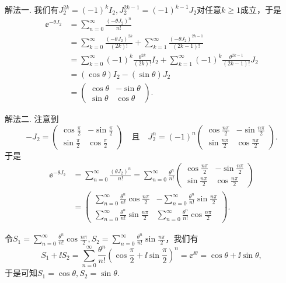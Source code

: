 \setcounter{solution}{20}

\begin{solution}
  {\kaishu 解法一.} 我们有$J_2^{2k}=(-1)^kI_2,J_2^{2k-1}=(-1)^{k-1}J_2$对任意$k\ge1$成立，于是
  \begin{align*}
    \ee^{-\theta J_2} & = \sum_{n=0}^\infty \frac{(-\theta J_2)^n}{n!} \\
    & = \sum_{k=0}^\infty \frac{(-\theta J_2)^{2k}}{(2k)!} + \sum_{k=1}^\infty \frac{(-\theta J_2)^{2k-1}}{(2k-1)!} \\
    & = \sum_{k=0}^\infty(-1)^k \frac{\theta^{2k}}{(2k)!}I_2 + \sum_{k=1}^\infty(-1)^k \frac{\theta^{2k-1}}{(2k-1)!}J_2 \\
    & = (\cos\theta)I_2 - (\sin\theta)J_2 \\
    & = \begin{pmatrix}
      \cos\theta & - \sin\theta \\
      \sin\theta & \cos\theta
    \end{pmatrix}.
  \end{align*}

  {\kaishu 解法二.} 注意到
  \[
    -J_2 = \begin{pmatrix}
      \cos\frac\pi2 & -\sin\frac\pi2 \\
      \sin\frac\pi2 & \cos\frac\pi2
    \end{pmatrix} \quad \text{且} \quad
    J_2^n = (-1)^n \begin{pmatrix}
      \cos\frac{n\pi}2 & -\sin\frac{n\pi}2 \\
      \sin\frac{n\pi}2 & \cos\frac{n\pi}2
    \end{pmatrix}.
  \]
  于是
  \begin{align*}
    \ee^{-\theta J_2} & = \sum_{n=0}^\infty \frac{(\theta J_2)^n}{n!} = \sum_{n=0}^\infty \frac{\theta^n}{n!} \begin{pmatrix}
      \cos\frac{n\pi}2 & -\sin\frac{n\pi}2 \\
      \sin\frac{n\pi}2 & \cos\frac{n\pi}2
    \end{pmatrix} \\
    & = \begin{pmatrix}
      \sum_{n=0}^\infty \frac{\theta^n}{n!}\cos\frac{n\pi}2 & -\sum_{n=0}^\infty \frac{\theta^n}{n!}\sin\frac{n\pi}2 \\
      \sum_{n=0}^\infty\frac{\theta^n}{n!}\sin\frac{n\pi}2 &
      \sum_{n=0}^\infty\frac{\theta^n}{n!}\cos\frac{n\pi}2
    \end{pmatrix}.
  \end{align*}

  令$S_1=\sum_{n=0}^\infty\frac{\theta^n}{n!}\cos\frac{n\pi}2,
  S_2=\sum_{n=0}^\infty\frac{\theta^n}{n!}\sin\frac{n\pi}2$，我们有
  \[
    S_1 + \ii S_2 = \sum_{n=0}^\infty \frac{\theta^n}{n!} \left( \cos\frac\pi2 + \ii\sin\frac\pi2 \right)^n = \ee^{\ii\theta} = \cos\theta + \ii\sin\theta,
  \]
  于是可知$S_1=\cos\theta,S_2=\sin\theta$.
\end{solution}

